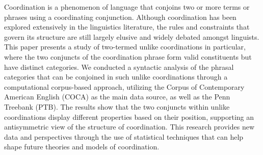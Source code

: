 Coordination is a phenomenon of language that conjoins two or more terms or phrases using a coordinating conjunction. Although coordination has been explored extensively in the linguistics literature, the rules and constraints that govern its structure are still largely elusive and widely debated amongst linguists. This paper presents a study of two-termed unlike coordinations in particular, where the two conjuncts of the coordination phrase form valid constituents but have distinct categories. We conducted a syntactic analysis of the phrasal categories that can be conjoined in such unlike coordinations through a computational corpus-based approach, utilizing the Corpus of Contemporary American English (COCA) as the main data source, as well as the Penn Treebank (PTB). The results show that the two conjuncts within unlike coordinations display different properties based on their position, supporting an antisymmetric view of the structure of coordination. This research provides new data and perspectives through the use of statistical techniques that can help shape future theories and models of coordination.
